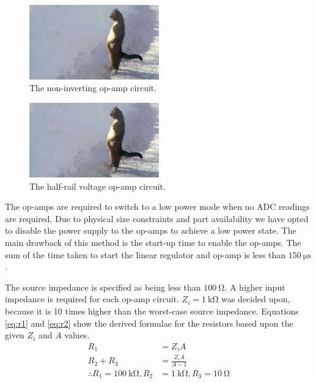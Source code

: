 \documentclass[12pt]{article}
\begin{document}
\begin{figure}[H]
	\centering
	\includegraphics[width=0.5\textwidth]{cat}
	\caption{The non-inverting op-amp circuit.}
	\label{fig:non-inverting-op-amp}
\end{figure}

\begin{figure}[H]
	\centering
	\includegraphics[width=0.5\textwidth]{cat}
	\caption{The half-rail voltage op-amp circuit.}
	\label{fig:half-supply}
\end{figure}

The op-amps are required to switch to a low power mode when no ADC readings are required.
Due to physical size constraints and part availability we have opted to disable the power supply to the op-amps to achieve a low power state.
The main drawback of this method is the start-up time to enable the op-amps.
The sum of the time taken to start the linear regulator and op-amp is less than $\SI{150}{\micro\second}$.

The source impedance is specified as being less than $\SI{100}{\ohm}$.
A higher input impedance is required for each op-amp circuit.
$Z_i = \SI{1}{\kilo\ohm}$ was decided upon, because it is 10 times higher than the worst-case source impedance.
Equations \ref{eq:r1} and \ref{eq:r2} show the derived formulae for the resistors based upon the given $Z_i$ and $A$ values.
\begin{align}
	R_1 &= Z_i A \label{eq:r1} \\
	R_2 + R_3 &= \frac{Z_i A}{A - 1} \label{eq:r2} \\[1em]
	\therefore R_1 = \SI{100}{\kilo\ohm}, R_2 &= \SI{1}{\kilo\ohm}, R_3 = \SI{10}{\ohm} \nonumber
\end{align}
\end{document}
